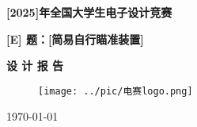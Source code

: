 \documentclass[UTF-8,zihao=-4]{ctexart}
\begin{document}
\begin{titlepage}
    \centering
    \vspace*{2cm}
    
    {\Huge \bfseries [2025]年全国大学生电子设计竞赛} %
    
    \vspace{2.5cm}
    
    {\huge \bfseries [E] 题：[简易自行瞄准装置]} %
    
    \vspace{1.5cm}
    
    {\Large \bfseries 设 计 报 告}
    
    \vspace{2cm}

    \begin{figure}[H]
        \centering
        \texttt{[image: ../pic/电赛logo.png]}
    \end{figure}

    \vspace{6.5cm}

    
    {\large \today}
    
\end{titlepage}

\end{document}
